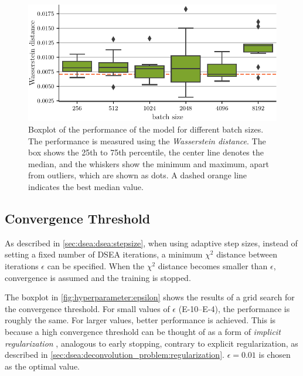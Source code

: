 \begin{figure}
  \centering
  \includegraphics[scale=1]{content/plots/hyperparam/batch_size_vs_wd_boxplot_lessheight.pdf}
  \caption{Boxplot of the performance of the model for different batch sizes.
    The performance is measured using the \emph{Wasserstein distance}.
    The box shows the 25th to 75th percentile,
    the center line denotes the median,
    and the whiskers show the minimum and maximum,
      apart from outliers,
        which are shown as dots.
    A dashed orange line indicates the best median value.
  }
  \label{fig:hyperparameter:batch_size}
\end{figure}


\subsection{Convergence Threshold}
As described in \autoref{sec:dsea:dsea:stepsize}, %
when using adaptive step sizes,
  instead of setting a fixed number of DSEA iterations,
a minimum $\chi^2$ distance between iterations $\epsilon$
can be specified.
When the $\chi^2$ distance becomes smaller than $\epsilon$,
convergence is assumed and the training is stopped.

The boxplot in \autoref{fig:hyperparameter:epsilon} shows the results of a grid search for the convergence threshold.
For small values of $\epsilon$
  (\numrange{E-10}{E-4}),
the performance is roughly the same.
%
For larger values, better performance is achieved. %
This is because a high convergence threshold can be thought of as
  a form of \emph{implicit regularization} \citationneeded{},
    analogous to early stopping,
  contrary to explicit regularization,
    as described in \autoref{sec:dsea:deconvolution_problem:regularization}.
$\epsilon = \num{0.01}$ is chosen as the optimal value.



